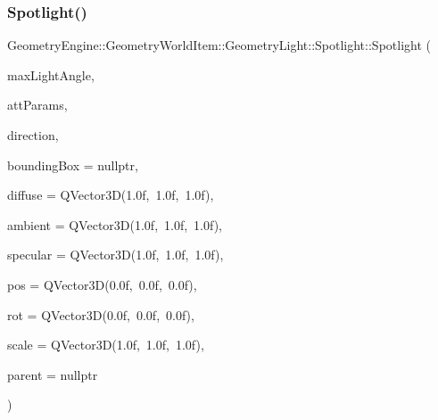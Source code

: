 \subsubsection{\texorpdfstring{Spotlight()}{Spotlight()}\hspace{0.1cm}{\footnotesize\ttfamily [1/2]}}
{\footnotesize\ttfamily Geometry\+Engine\+::\+Geometry\+World\+Item\+::\+Geometry\+Light\+::\+Spotlight\+::\+Spotlight (\begin{DoxyParamCaption}\item[{float}]{max\+Light\+Angle,  }\item[{const Q\+Vector3D \&}]{att\+Params,  }\item[{const Q\+Vector3D \&}]{direction,  }\item[{\mbox{\hyperlink{class_geometry_engine_1_1_geometry_world_item_1_1_geometry_item_1_1_geometry_item}{Geometry\+Item\+::\+Geometry\+Item}} $\ast$}]{bounding\+Box = {\ttfamily nullptr},  }\item[{const Q\+Vector3D \&}]{diffuse = {\ttfamily QVector3D(1.0f,~1.0f,~1.0f)},  }\item[{const Q\+Vector3D \&}]{ambient = {\ttfamily QVector3D(1.0f,~1.0f,~1.0f)},  }\item[{const Q\+Vector3D \&}]{specular = {\ttfamily QVector3D(1.0f,~1.0f,~1.0f)},  }\item[{const Q\+Vector3D \&}]{pos = {\ttfamily QVector3D(0.0f,~0.0f,~0.0f)},  }\item[{const Q\+Vector3D \&}]{rot = {\ttfamily QVector3D(0.0f,~0.0f,~0.0f)},  }\item[{const Q\+Vector3D \&}]{scale = {\ttfamily QVector3D(1.0f,~1.0f,~1.0f)},  }\item[{\mbox{\hyperlink{class_geometry_engine_1_1_geometry_world_item_1_1_world_item}{World\+Item}} $\ast$}]{parent = {\ttfamily nullptr} }\end{DoxyParamCaption})}

